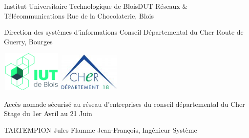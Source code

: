 \documentclass{report}
\begin{document}
\begin{titlepage}
\begin{minipage}{0.5\textwidth}
Institut Universitaire  Technologique de Blois\newline	DUT Réseaux \& Télécommunications Rue de la Chocolaterie, Blois\newline
\end{minipage}\hfill
\begin{minipage}{0.5\textwidth}
Direction des systèmes d'informations
Conseil Départemental du Cher Route de Guerry, Bourges\newline
\end{minipage}

\vfill \includegraphics[width=3cm,height=2cm]{./images/images/logo_iut.jpg}
\hfill \includegraphics[width=3cm,height=2cm]{./images/images/logo_cd18.jpg}

\vspace{3cm}

\begin{center}
\vfill{\Large Accès nomade sécurisé au réseau d'entreprises }
\vfill{\Large du conseil départemental du Cher}
\vfill{Stage du 1er Avril au 21 Juin}
\end{center}

\vfill TARTEMPION Jules
\hfill Flamme Jean-François, Ingénieur Système

\end{titlepage}




\end{document}
